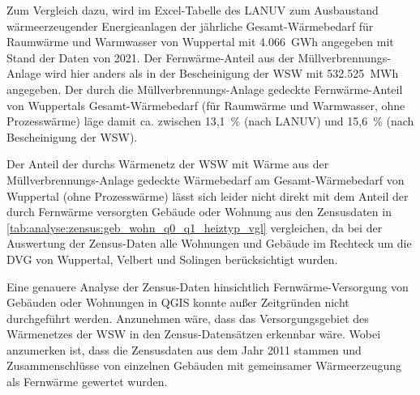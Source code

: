 		Zum Vergleich dazu, wird im Excel-Tabelle des LANUV zum Ausbaustand wärmeerzeugender Energieanlagen der jährliche Gesamt-Wärmebedarf für Raumwärme und Warmwasser von Wuppertal mit 4.066~GWh angegeben mit Stand der Daten von 2021. Der Fernwärme-Anteil aus der Müllverbrennungs-Anlage wird hier anders als in der Bescheinigung der WSW mit 532.525~MWh angegeben. Der durch die Müllverbrennungs-Anlage gedeckte Fernwärme-Anteil von Wuppertals Gesamt-Wärmebedarf (für Raumwärme und Warmwasser, ohne Prozesswärme) läge damit ca. zwischen 13,1~\% (nach LANUV) und 15,6~\% (nach Bescheinigung der WSW). 
		
		Der Anteil der durchs Wärmenetz der WSW mit Wärme aus der Müllverbrennungs-Anlage gedeckte Wärmebedarf am Gesamt-Wärmebedarf von Wuppertal (ohne Prozesswärme) lässt sich leider nicht direkt mit dem Anteil der durch Fernwärme versorgten Gebäude oder Wohnung aus den Zensusdaten in \autoref{tab:analyse:zensus:geb_wohn_q0_q1_heiztyp_vgl} vergleichen, da bei der Auswertung der Zensus-Daten alle Wohnungen und Gebäude im Rechteck um die DVG von Wuppertal, Velbert und Solingen berücksichtigt wurden. 
		
		Eine genauere Analyse der Zensus-Daten hinsichtlich Fernwärme-Versorgung von Gebäuden oder Wohnungen in QGIS konnte außer Zeitgründen nicht durchgeführt werden. Anzunehmen wäre, dass das Versorgungsgebiet des Wärmenetzes der WSW in den Zensus-Datensätzen erkennbar wäre. Wobei anzumerken ist, dass die Zensusdaten aus dem Jahr 2011 stammen und Zusammenschlüsse von einzelnen Gebäuden mit gemeinsamer Wärmeerzeugung als Fernwärme gewertet wurden. 
		

		
		